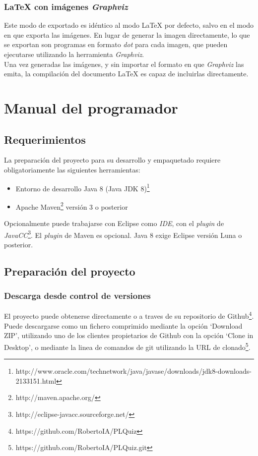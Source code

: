 \subsubsection{\LaTeX{} con imágenes \emph{Graphviz}}
Este modo de exportado es idéntico al modo \LaTeX{} por defecto, salvo en el modo en que exporta las imágenes.
En lugar de generar la imagen directamente, lo que se exportan son programas en formato \emph{dot} para cada imagen, que pueden ejecutarse utilizando la herramienta \emph{Graphviz}.
\\
Una vez generadas las imágenes, y sin importar el formato en que \emph{Graphviz} las emita, la compilación del documento \LaTeX{} es capaz de incluirlas directamente.

\section{Manual del programador}

\subsection{Requerimientos}
La preparación del proyecto para su desarrollo y empaquetado requiere obligatoriamente las siguientes herramientas:
\begin{itemize}
	\item Entorno de desarrollo Java 8 (Java JDK 8)\footnote{http://www.oracle.com/technetwork/java/javase/downloads/jdk8-downloads-2133151.html}
	\item Apache Maven\footnote{http://maven.apache.org/} versión 3 o posterior
\end{itemize}

Opcionalmente puede trabajarse con Eclipse como \emph{IDE}, con el \emph{plugin} de \emph{JavaCC}\footnote{http://eclipse-javacc.sourceforge.net/}.
El \emph{plugin} de Maven es opcional.
Java 8 exige Eclipse versión Luna o posterior.

\subsection{Preparación del proyecto}
\subsubsection{Descarga desde control de versiones}
El proyecto puede obtenerse directamente o a traves de su repositorio de Github\footnote{https://github.com/RobertoIA/PLQuiz}. Puede descargarse como un fichero comprimido mediante la opción `Download ZIP', utilizando uno de los clientes propietarios de Github con la opción `Clone in Desktop', o mediante la linea de comandos de git utilizando la URL de clonado\footnote{https://github.com/RobertoIA/PLQuiz.git}.

